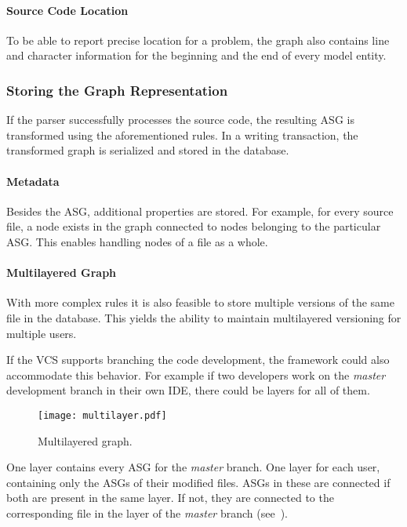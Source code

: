\paragraph{Source Code Location}
To be able to report precise location for a problem, the graph also contains line and character information for the beginning and the end of every model entity.


\subsubsection{Storing the Graph Representation}
If the parser successfully processes the source code, the resulting ASG is transformed using the aforementioned rules. In a writing transaction, the transformed graph is serialized and stored in the database.

\paragraph{Metadata}
Besides the ASG, additional properties are stored. For example, for every source file, a node exists in the graph connected to nodes belonging to the particular ASG. This enables handling nodes of a file as a whole.

\paragraph{Multilayered Graph}
With more complex rules it is also feasible to store multiple versions of the same file in the database. This yields the ability to maintain multilayered versioning for multiple users.

If the VCS supports branching the code development, the framework could also accommodate this behavior. For example if two developers work on the \emph{master} development branch in their own IDE, there could be layers for all of them.

\begin{figure}[!htb]
  \centering
  \texttt{[image: multilayer.pdf]}
  \caption{Multilayered graph.}
  \label{fig:multilayered-graph}
\end{figure}

One layer contains every ASG for the \emph{master} branch. One layer for each user, containing only the ASGs of their modified files. ASGs in these are connected if both are present in the same layer. If not, they are connected to the corresponding file in the layer of the \emph{master} branch (see~).

